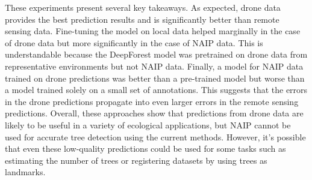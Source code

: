 These experiments present several key takeaways. As expected, drone data provides the best prediction results and is significantly better than remote sensing data. Fine-tuning the model on local data helped marginally in the case of drone data but more significantly in the case of NAIP data. This is understandable because the DeepForest model was pretrained on drone data from representative environments but not NAIP data. Finally, a model for NAIP data trained on drone predictions was better than a pre-trained model but worse than a model trained solely on a small set of annotations. This suggests that the errors in the drone predictions propagate into even larger errors in the remote sensing predictions. Overall, these approaches show that predictions from drone data are likely to be useful in a variety of ecological applications, but NAIP cannot be used for accurate tree detection using the current methods. However, it's possible that even these low-quality predictions could be used for some tasks such as estimating the number of trees or registering datasets by using trees as landmarks.

